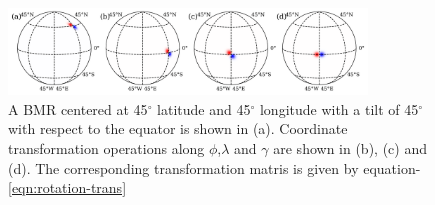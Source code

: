 \begin{figure}
    \centering
    \includegraphics[width=0.85\textwidth]{assets/rotation_bmr.png}
    \caption{A BMR centered at 45$^{\circ}$ latitude and 45$^{\circ}$ longitude with a tilt of 45$^{\circ}$ with respect to the equator is shown in (a). Coordinate transformation operations along $\phi$,$\lambda$ and $\gamma$ are shown in (b), (c) and (d). The corresponding transformation matris is given by equation-\ref{eqn:rotation-trans}}
    \label{fig:rotation-bmr}
\end{figure}






